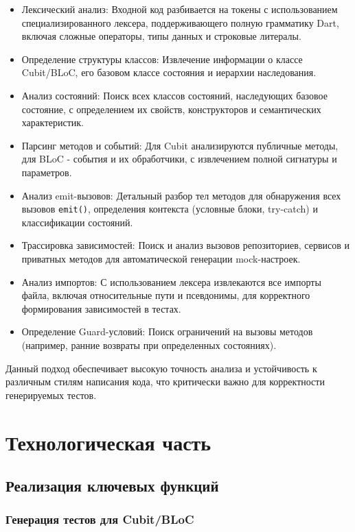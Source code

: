 \documentclass[14pt, russian]{scrartcl}
\begin{document}
\begin{itemize}
    \item Лексический анализ: Входной код разбивается на токены с использованием специализированного лексера, поддерживающего полную грамматику Dart, включая сложные операторы, типы данных и строковые литералы.
    \item Определение структуры классов: Извлечение информации о классе Cubit/BLoC, его базовом классе состояния и иерархии наследования.
    \item Анализ состояний: Поиск всех классов состояний, наследующих базовое состояние, с определением их свойств, конструкторов и семантических характеристик.
    \item Парсинг методов и событий: Для Cubit анализируются публичные методы, для BLoC - события и их обработчики, с извлечением полной сигнатуры и параметров.
    \item Анализ emit-вызовов: Детальный разбор тел методов для обнаружения всех вызовов \texttt{emit()}, определения контекста (условные блоки, try-catch) и классификации состояний.
    \item Трассировка зависимостей: Поиск и анализ вызовов репозиториев, сервисов и приватных методов для автоматической генерации mock-настроек.
    \item Анализ импортов: С использованием лексера извлекаются все импорты файла, включая относительные пути и псевдонимы, для корректного формирования зависимостей в тестах.
    \item Определение Guard-условий: Поиск ограничений на вызовы методов (например, ранние возвраты при определенных состояниях).
\end{itemize}

Данный подход обеспечивает высокую точность анализа и устойчивость к различным стилям написания кода, что критически важно для корректности генерируемых тестов.

\section{Технологическая часть}

\subsection{Реализация ключевых функций}

\subsubsection{Генерация тестов для Cubit/BLoC}
\end{document}
